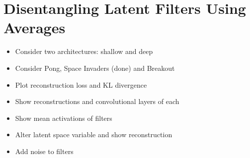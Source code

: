 %
%
%
%
%
\section{Disentangling Latent Filters Using Averages}
\begin{itemize}
\item Consider two architectures: shallow and deep
\item Consider Pong, Space Invaders (done) and Breakout
\item Plot reconstruction loss and KL divergence
\item Show reconstructions and convolutional layers of each
\item Show mean activations of filters
\item Alter latent space variable and show reconstruction
\item Add noise to filters
\end{itemize}


